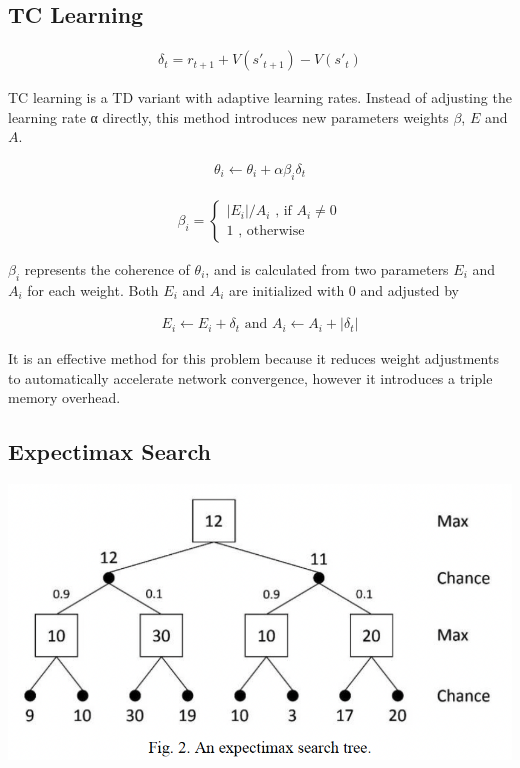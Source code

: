 \documentclass[letterpaper]{article} %
\begin{document}
\subsection{TC Learning}

\begin{align}
    \delta_t = r_{t+1} + V(s'_{t+1}) - V(s'_t)
\end{align}

TC learning is a TD variant with adaptive learning rates. Instead of adjusting the learning rate α directly, this method introduces new parameters weights $\beta$, $E$ and $A$.

\begin{align}
    \theta_i \gets \theta_i + \alpha \beta_i \delta_t
\end{align}

\begin{align}
    \beta_i = \begin{cases}
        |E_i| / A_i \text{ , if } A_i \neq 0\\
        1 \text{ , otherwise}
    \end{cases}
\end{align}

$\beta_i$ represents the coherence of $\theta_i$, and is calculated from two parameters $E_i$ and $A_i$ for each weight. Both $E_i$ and $A_i$ are initialized with 0 and adjusted by

\begin{align}
    E_i \gets E_i + \delta_t \text{ and } A_i \gets A_i + | \delta_t |
\end{align}

It is an effective method for this problem because it reduces weight adjustments to automatically accelerate network convergence, however it introduces a triple memory overhead.

\subsection{Expectimax Search}

\begin{center}
    \includegraphics[scale=.5]{images/tree-search.png}
\end{center}
\end{document}

